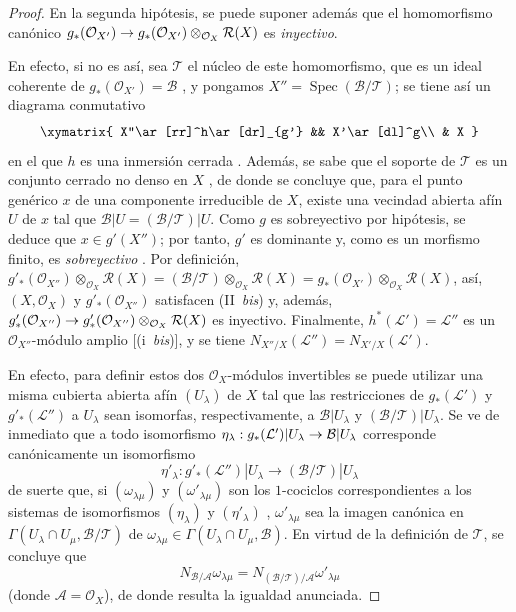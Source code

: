 \documentclass[oneside,10pt]{amsart}
\makeatletter
\newcommand{\ega@arrow}[2]{\mathchoice{#1}{#2}{#2}{#2}}
\renewcommand{\to}{\ega@arrow{\longrightarrow}{\rightarrow}}
\newcommand{\oldpage}[2][]{\marginnote{\normalfont\footnotesize\textbf{#1}~|~#2}\ignorespaces}
\makeatother
\begin{document}
\begin{proof}
En la segunda hipótesis, se puede suponer además que el homomorfismo canónico
$g_*(\mathcal{O}_{X'})\to
g_*(\mathcal{O}_{X'})\otimes_{\mathcal{O}_X}\mathcal{R}(X)$
es \emph{inyectivo}.

En efecto, si no es así, sea $\mathcal{T}$ 
\oldpage[II]{131}
el núcleo de este homomorfismo, que es un ideal coherente de $g_*(\mathcal{O}_{X'})=\mathcal{B}$ , y pongamos $X''=\operatorname{Spec}(\mathcal{B}/\mathcal{T})$;
se tiene así un diagrama conmutativo
\[
\xymatrix{
X''\ar[rr]^h\ar[dr]_{g'} && X'\ar[dl]^g\\
& X
}
\]
en el que $h$ es una inmersión cerrada .
Además, se sabe que el soporte de $\mathcal{T}$ es un conjunto cerrado  no denso en $X$ , de donde se concluye que, para el punto genérico $x$ de una componente irreducible de $X$, existe una vecindad abierta afín $U$ de $x$ tal que
$\mathcal{B}|U=(\mathcal{B}/\mathcal{T})|U$.
Como $g$ es sobreyectivo por hipótesis, se deduce que $x\in g'(X'')$;
por tanto, $g'$ es dominante y, como es un morfismo finito, es \emph{sobreyectivo} .
Por definición,
$g'_*(\mathcal{O}_{X''})\otimes_{\mathcal{O}_X}\mathcal{R}(X)
=(\mathcal{B}/\mathcal{T})\otimes_{\mathcal{O}_X}\mathcal{R}(X)
=g_*(\mathcal{O}_{X'})\otimes_{\mathcal{O}_X}\mathcal{R}(X)$,
así, $(X,\mathcal{O}_X)$ y $g'_*(\mathcal{O}_{X''})$ satisfacen (II~\emph{bis}) y, además,
$g'_*(\mathcal{O}_{X''})\to
g'_*(\mathcal{O}_{X''})\otimes_{\mathcal{O}_X}\mathcal{R}(X)$
es inyectivo.
Finalmente, $h^*(\mathcal{L}')=\mathcal{L}''$ es un $\mathcal{O}_{X''}$-módulo amplio [(i~\emph{bis})], y se tiene
$N_{X''/X}(\mathcal{L}'')=N_{X'/X}(\mathcal{L}')$.

En efecto, para definir estos dos $\mathcal{O}_X$-módulos invertibles se puede utilizar una misma cubierta abierta afín $(U_\lambda)$ de $X$ tal que las restricciones de $g_*(\mathcal{L}')$ y $g'_*(\mathcal{L}'')$ a $U_\lambda$ sean isomorfas, respectivamente, a $\mathcal{B}|U_\lambda$ y $(\mathcal{B}/\mathcal{T})|U_\lambda$.
Se ve de inmediato que a todo isomorfismo
$\eta_\lambda:g_*(\mathcal{L}')|U_\lambda\to\mathcal{B}|U_\lambda$
corresponde canónicamente un isomorfismo
\[
\eta'_\lambda:g'_*(\mathcal{L}'')|U_\lambda\longrightarrow
(\mathcal{B}/\mathcal{T})|U_\lambda
\]
de suerte que, si $(\omega_{\lambda\mu})$ y $(\omega'_{\lambda\mu})$ son los $1$-cociclos correspondientes a los sistemas de isomorfismos $(\eta_\lambda)$ y $(\eta'_\lambda)$ , $\omega'_{\lambda\mu}$ sea la imagen canónica en
$\Gamma(U_\lambda\cap U_\mu,\mathcal{B}/\mathcal{T})$
de $\omega_{\lambda\mu}\in\Gamma(U_\lambda\cap U_\mu,\mathcal{B})$.
En virtud de la definición de $\mathcal{T}$, se concluye que
\[
N_{\mathcal{B}/\mathcal{A}}\omega_{\lambda\mu}
=N_{(\mathcal{B}/\mathcal{T})/\mathcal{A}}\omega'_{\lambda\mu}
\]
(donde $\mathcal{A}=\mathcal{O}_X$), de donde resulta la igualdad anunciada.


\end{proof}
\end{document}
